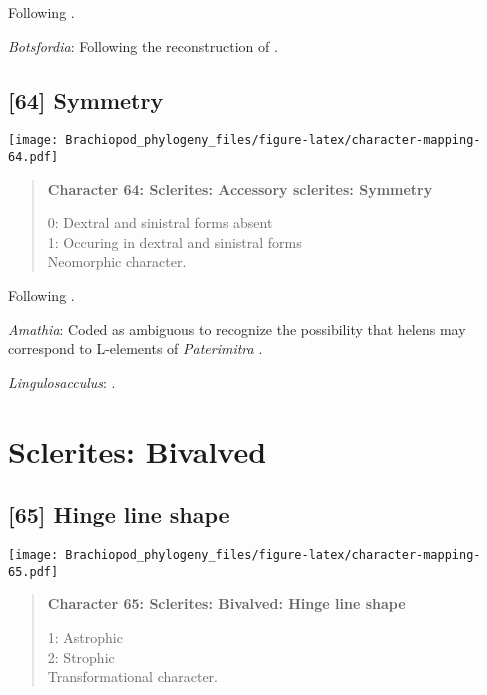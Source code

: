 \documentclass[openany]{book}
\theoremstyle{definition}
\theoremstyle{definition}
\theoremstyle{definition}
\theoremstyle{remark}
\begin{document}
Following \citet{Zhao2017}.

\hypertarget{Botsfordia-coding-63}{}
\emph{Botsfordia}: Following the reconstruction of
\citet{Skovsted2015Theearly}.

\subsection*{{[}64{]} Symmetry}\label{symmetry}

\texttt{[image: Brachiopod\_phylogeny\_files/figure-latex/character-mapping-64.pdf]}

\begin{quote}
\textbf{Character 64: Sclerites: Accessory sclerites: Symmetry}

0: Dextral and sinistral forms absent\\
1: Occuring in dextral and sinistral forms\\
Neomorphic character.
\end{quote}

Following \citet{Zhao2017}.

\hypertarget{Amathia-coding-64}{}
\emph{Amathia}: Coded as ambiguous to recognize the possibility that
helens may correspond to L-elements of \emph{Paterimitra}
\citep{Moysiuk2017Hyolithsare}.

\hypertarget{Lingulosacculus-coding-64}{}
\emph{Lingulosacculus}: \citet{Skovsted2008Thescleritome}.

\section{Sclerites: Bivalved}\label{sclerites-bivalved}

\subsection*{{[}65{]} Hinge line shape}\label{hinge-line-shape}

\texttt{[image: Brachiopod\_phylogeny\_files/figure-latex/character-mapping-65.pdf]}

\begin{quote}
\textbf{Character 65: Sclerites: Bivalved: Hinge line shape}

1: Astrophic\\
2: Strophic\\
Transformational character.
\end{quote}
\end{document}
